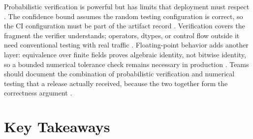 Probabilistic verification is powerful but has limits that deployment must respect \citep{wu2024mirage,patel2025llminference}. The confidence bound assumes the random testing configuration is correct, so the CI configuration must be part of the artifact record \citep{wu2024mirage,chen2020compilerbasedhardw}. Verification covers the fragment the verifier understands; operators, dtypes, or control flow outside it need conventional testing with real traffic \citep{wu2024mirage,memoryfloor2026}. Floating-point behavior adds another layer: equivalence over finite fields proves algebraic identity, not bitwise identity, so a bounded numerical tolerance check remains necessary in production \citep{dao2022flashattention,wu2024mirage}. Teams should document the combination of probabilistic verification and numerical testing that a release actually received, because the two together form the correctness argument \citep{wu2024mirage,taxbreak2026}.

\section{Key Takeaways}
\label{sec:ch20_key_takeaways}

